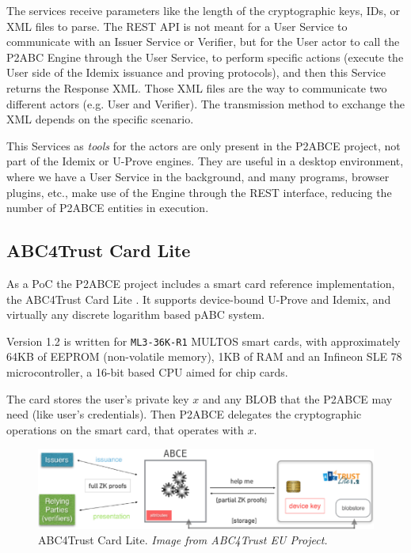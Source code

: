The services receive parameters like the length of the cryptographic keys, IDs, or XML files to parse. The REST API is not meant for a User Service to communicate with an Issuer Service or Verifier, but for the User actor to call the P2ABC Engine through the User Service, to perform specific actions (execute the User side of the Idemix issuance and proving protocols), and then this Service returns the Response XML. Those XML files are the way to communicate two different actors (e.g. User and Verifier). The transmission method to exchange the XML depends on the specific scenario.

This Services as \textit{tools} for the actors are only present in the P2ABCE project, not part of the Idemix or U-Prove engines. They are useful in a desktop environment, where we have a User Service in the background, and many programs, browser plugins, etc., make use of the Engine through the REST interface, reducing the number of P2ABCE entities in execution.


\subsection{ABC4Trust Card Lite}

As a PoC the P2ABCE project includes a smart card reference implementation, the ABC4Trust Card Lite \citep{ABC4TCardLite}. It supports device-bound U-Prove and Idemix, and virtually any discrete logarithm based pABC system.

Version 1.2 is written for \texttt{ML3-36K-R1} MULTOS smart cards, with approximately 64KB of EEPROM (non-volatile memory), 1KB of RAM and an Infineon SLE 78 microcontroller, a 16-bit based CPU aimed for chip cards.

The card stores the user's private key $x$ and any \ac{BLOB} that the P2ABCE may need (like user's credentials). Then P2ABCE delegates the cryptographic operations on the smart card, that operates with $x$.

\begin{figure}[bth]
	\begin{center}
		\includegraphics[width=\linewidth]{gfx/ABC4TCardLite}
	\end{center}
	\caption{ABC4Trust Card Lite. \textit{Image from ABC4Trust EU Project.}}
	\label{fig:ABC4TCardLite}
\end{figure}

